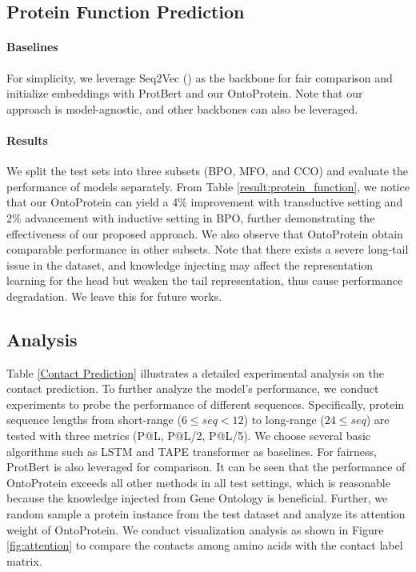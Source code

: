 \subsection*{Protein Function Prediction}
\paragraph{Baselines}
For simplicity, we leverage Seq2Vec (\cite{littmann2021embeddings}) as the backbone for fair comparison and initialize embeddings with ProtBert and our OntoProtein.
Note that our approach is model-agnostic, and other backbones can also be leveraged. 
 
\paragraph{Results}
We split the test sets into three subsets (BPO, MFO, and CCO) and evaluate the performance of models separately.
From Table \ref{result:protein_function}, we notice that our OntoProtein can yield a 4\% improvement with transductive setting and 2\% advancement with inductive setting in BPO, further demonstrating the effectiveness of our proposed approach. 
We also observe that OntoProtein obtain comparable performance in other subsets.
Note that there exists a severe long-tail issue in the dataset, and knowledge injecting may affect the representation learning for the head but weaken the tail representation, thus cause performance degradation.
We leave this for future works.

\subsection{Analysis}
Table \ref{Contact Prediction} illustrates a detailed experimental analysis on the contact prediction. 
To further analyze the model’s performance, we conduct experiments to probe the performance of different sequences.
Specifically, protein sequence lengths from short-range ($6 \le seq < 12$) to long-range ($24 \le seq$) are tested with three metrics (P@L, P@L/2, P@L/5).
We choose several basic algorithms such as LSTM and TAPE transformer as baselines.
For fairness, ProtBert is also leveraged for comparison.
It can be seen that the performance of OntoProtein exceeds all other methods in all test settings, which is reasonable because the knowledge injected from Gene Ontology is beneficial.
{\color{highlight} 
Further, we random sample a protein instance from the test dataset and analyze its attention weight of OntoProtein. 
We conduct visualization analysis as shown in Figure \ref{fig:attention} to compare the contacts among amino acids with the contact label matrix.
}

